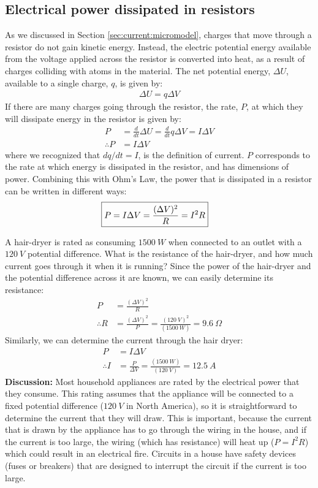 \subsection{Electrical power dissipated in resistors}
As we discussed in Section \ref{sec:current:micromodel}, charges that move through a resistor do not gain kinetic energy. Instead, the electric potential energy available from the voltage applied across the resistor is converted into heat, as a result of charges colliding with atoms in the material. The net potential energy, $\Delta U$, available to a single charge, $q$, is given by:
\begin{align*}
\Delta U=q\Delta V
\end{align*}
If there are many charges going through the resistor, the rate, $P$, at which they will dissipate energy in the resistor is given by:
\begin{align*}
P&=\frac{d}{dt}\Delta U=\frac{d}{dt}q\Delta V=I\Delta V\\
\therefore P&=I\Delta V
\end{align*}
where we recognized that $dq/dt=I$, is the definition of current. $P$ corresponds to the rate at which energy is dissipated in the resistor, and has dimensions of power. Combining this with Ohm's Law, the power that is dissipated in a resistor can be written in different ways:
\begin{align*}
\Aboxed{P=I \Delta V=\frac{(\Delta V)^2}{R}=I^2R}
\end{align*}
\begin{example}{A hair-dryer is rated as consuming $\SI{1500}{W}$ when connected to an outlet with a $\SI{120}{V}$ potential difference. What is the resistance of the hair-dryer, and how much current goes through it when it is running?}
Since the power of the hair-dryer and the potential difference across it are known, we can easily determine its resistance:
\begin{align*}
P&=\frac{(\Delta V)^2}{R}\\
\therefore R&=\frac{(\Delta V)^2}{P}=\frac{(\SI{120}{V})^2}{(\SI{1500}{W})}=\SI{9.6}{\Omega}
\end{align*}
Similarly, we can determine the current through the hair dryer:
\begin{align*}
P&=I\Delta V\\
\therefore I &=\frac{P}{\Delta V}=\frac{(\SI{1500}{W})}{(\SI{120}{V})}=\SI{12.5}{A}
\end{align*}
\textbf{Discussion: }Most household appliances are rated by the electrical power that they consume. This rating assumes that the appliance will be connected to a fixed potential difference ($\SI{120}{V}$ in North America), so it is  straightforward to determine the current that they will draw. This is important, because the current that is drawn by the appliance has to go through the wiring in the house, and if the current is too large, the wiring (which has resistance) will heat up ($P=I^2R$) which could result in an electrical fire. Circuits in a house have safety devices (fuses or breakers) that are designed to interrupt the circuit if the current is too large. 
\end{example}

